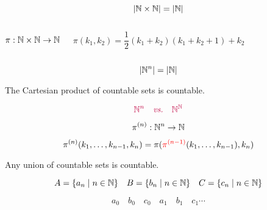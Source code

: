 \begin{frame}{}
  \begin{theorem}
    \[
      |\mathbb{N} \times \mathbb{N}| = |\mathbb{N}|
    \]
  \end{theorem}

  \begin{columns}
      \pause
      \[
	\pi: \mathbb{N} \times \mathbb{N} \to \mathbb{N}
      \]

      \pause
      \[
	\pi(k_1, k_2) = \frac{1}{2} (k_1 + k_2)(k_1 + k_2 + 1) + k_2
      \]
  \end{columns}

  \pause
  \begin{center}
  \end{center}
\end{frame}

\begin{frame}{}
  \begin{theorem}[$\N^{n}$ is Countable.]
    \[
      |\mathbb{N}^{n}| = |\mathbb{N}|
    \]
  \end{theorem}

  \pause
  \begin{theorem}
    The Cartesian product of  countable sets is countable.
  \end{theorem}

  \pause
  \[
    \textcolor{purple}{\mathbb{N}^{n} \quad \text{\it vs.} \quad \mathbb{N}^{\mathbb{N}}}
  \]

  \pause
  \[
    \pi^{(n)}:\mathbb{N}^n \to \mathbb{N}
  \]

  \pause
  \[
    \pi^{(n)}(k_1, \ldots, k_{n-1}, k_n) = \pi (\textcolor{red}{\pi^{(n-1)}}(k_1, \ldots, k_{n-1}) , k_n)
  \]
\end{frame}

\begin{frame}{}
  \begin{theorem}
    Any  union of countable sets is countable.
  \end{theorem}

  \pause
  \[
    A = \{a_n \mid n \in \mathbb{N}\} \quad B = \{b_n \mid n \in \mathbb{N}\} \quad C = \{c_n \mid n \in \mathbb{N}\}
  \]

  \pause
  \[
    a_0 \quad b_0 \quad c_0 \quad a_1 \quad b_1 \quad c_1 \cdots
  \]
\end{frame}

